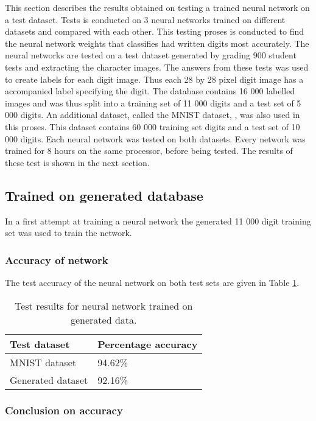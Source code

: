 This section describes the results obtained on testing a trained neural network on a test dataset. Tests is conducted on 3 neural networks trained on different datasets and compared with each other. This testing proses is conducted to find the neural network weights that classifies had written digits most accurately. The neural networks are tested on a test dataset generated by grading 900 student tests and extracting the character images. The answers from these tests was used to create labels for each digit image. Thus each 28 by 28 pixel digit image has a accompanied label specifying the digit. The database contains 16 000 labelled images and was thus split into a training set of 11 000 digits and a test set of 5 000 digits. An additional dataset, called the MNIST dataset, \citep{mnist}, was also used in this proses. This dataset contains 60 000 training set digits and a test set of 10 000 digits. Each neural network was tested on both datasets. Every network was trained for 8 hours on the same processor, before being tested. The results of these test is shown in the next section.
\subsection{Trained on generated database}
In a first attempt at training a neural network the generated 11 000 digit training set was used to train the network.

\subsubsection{Accuracy of network}

The test accuracy of the neural network on both test sets are given in Table \ref{tbl:nnResult1}.

\begin{table}
\caption{Test results for neural network trained on generated data.} \label{tbl:nnResult1}
  \centering
\begin{tabular}{|p{4cm}|p{5cm}|}
\hline
\textbf{Test dataset}&\textbf{Percentage accuracy}\\
\hline
MNIST dataset&94.62\%\\
\hline
Generated dataset&92.16\%\\
\hline
\end{tabular}
\end{table}

\subsubsection{Conclusion on accuracy}

